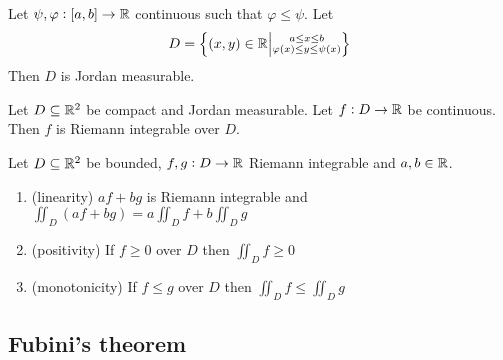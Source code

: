 \documentclass[12pt]{extarticle}
\begin{document}
\begin{proposition}
    Let $\psi, \varphi: [a, b] \to \mathbb{R}$ continuous such that $\varphi \leq \psi$.
    Let
    \begin{equation}
        D = \left\{(x, y) \in \mathbb{R} \middle| \substack{a \leq x \leq b \\ \varphi(x) \leq y \leq \psi(x)}\right\}
    \end{equation}
    Then $D$ is Jordan measurable.
\end{proposition}

\begin{theorem}
    Let $D \subseteq \mathbb{R}^2$ be compact and Jordan measurable.
    Let $f: D \to \mathbb{R}$ be continuous.
    Then $f$ is Riemann integrable over $D$.
\end{theorem}

\begin{proposition}
    Let $D \subseteq \mathbb{R}^2$ be bounded, $f, g : D \to \mathbb{R}$ Riemann integrable and $a, b \in \mathbb{R}$.
    \begin{enumerate}[label=\roman*.]
        \item (linearity) $af + bg$ is Riemann integrable and
              $\iint_D (af + bg) = a \iint_D f + b \iint_D g$
        \item (positivity) If $f \geq 0$ over $D$ then $\iint_D f \geq 0$
        \item (monotonicity) If $f \leq g$ over $D$ then $\iint_D f \leq \iint_D g$
    \end{enumerate}
\end{proposition}

\subsection{Fubini's theorem}
\end{document}
